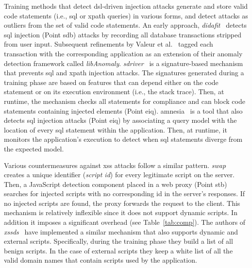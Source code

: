 \documentclass[conference]{IEEEtran}
\begin{document}
Training methods that detect {\sc dsl}-driven injection attacks
generate and store valid code statements (i.e., {\sc sql} or {\sc
  xp}ath queries) in various forms, and detect attacks as outliers
from the set of valid code statements. An early approach, {\it {\sc
    didafit}}~\cite{LLW02} detects {\sc sql} injection (Point
{\sc sdb}) attacks by recording all database transactions
stripped from user input. Subsequent
refinements by Valeur et al.~\cite{VMV05} tagged each transaction with
the corresponding application as an extension of their anomaly
detection framework called {\it libAnomaly}. {\it {\sc
    sd}river}~\cite{MS09,MKS09,MKLS11} is a signature-based mechanism
that prevents {\sc sql} and {\sc xp}ath injection attacks. The
signatures generated during a training phase are based on features
that can depend either on the code statement or on its execution
environment (i.e., the stack trace). Then, at runtime, the mechanism
checks all statements for compliance and can block code statements
containing injected elements (Point {\sc e}i{\sc q}). {\sc
  amnesia}~\cite{HO05,HO06,HO05b} is a tool that also detects {\sc
  sql} injection attacks (Point {\sc e}i{\sc q}) by associating a query model
with the location of every {\sc sql} statement within the application.
Then, at runtime, it monitors the application's execution to detect
when {\sc sql} statements diverge from the expected model.

Various countermeasures against {\sc xss} attacks follow a similar
pattern. {\it {\sc swap}}~\cite{WPLKK09} creates a unique identifier
({\it script {\sc id}}) for every legitimate script on the server.
Then, a JavaScript detection component placed in a web proxy (Point
{\sc s}t{\sc b}) searches for injected scripts with no corresponding {\sc id}
in the server's responses. If no injected scripts are found, the proxy
forwards the request to the client. This mechanism is relatively
inflexible since it does not support dynamic scripts. In addition it
imposes a significant overhead (see Table~\ref{tab:comp}). The authors
of {\it {\sc xssds}}~\cite{JEP08} have implemented a similar mechanism
that also supports dynamic and external scripts. Specifically, during the
training phase they build a list of all benign scripts. In the case of
external scripts they keep a white list of all the valid domain names
that contain scripts used by the application.
\end{document}
